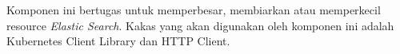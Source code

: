 Komponen ini bertugas untuk memperbesar, membiarkan atau memperkecil resource \textit{Elastic Search}. Kakas yang akan digunakan oleh komponen ini adalah Kubernetes Client Library dan HTTP Client.



